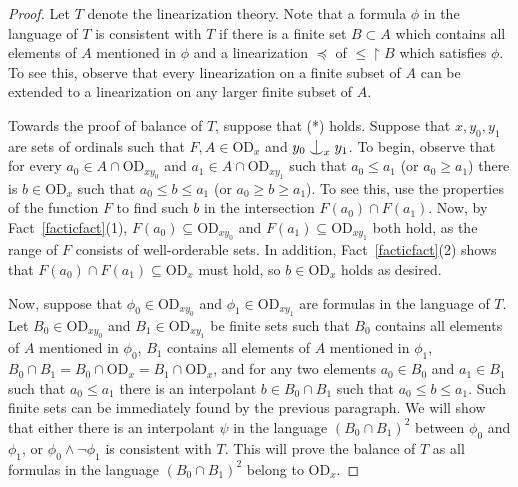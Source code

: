 \documentclass{article}
\newcommand{\forkindep}[1][]{%
  \mathrel{
    \mathop{
      \vcenter{
        \hbox{\oalign{\noalign{\kern-.3ex}\hfil$\vert$\hfil\cr
              \noalign{\kern-.7ex}
              $\smile$\cr\noalign{\kern-.3ex}}}
      }
    }\displaylimits_{#1}
  }
}
\newcommand{\vd}{\mathrm{OD}}
\theoremstyle{definition}
\begin{document}
\begin{proof}
Let $T$ denote the linearization theory. Note that a formula $\phi$ in the language of $T$ is consistent with $T$ if there is a finite set $B\subset A$ which contains all elements of $A$ mentioned in $\phi$ and a linearization $\preceq$ of $\leq\restriction B$ which satisfies $\phi$. To see this, observe that every linearization on a finite subset of $A$ can be extended to a linearization on any larger finite subset of $A$.

Towards the proof of balance of $T$, suppose that (*) holds. Suppose that $x, y_0, y_1$ are sets of ordinals such that $F, A\in\vd_x$ and $y_0\forkindep[x]y_1$. 
To begin, observe that for every $a_0\in A\cap\vd_{xy_0}$ and $a_1\in A\cap\vd_{xy_1}$ such that $a_0\leq a_1$ (or $a_0\geq a_1$) there is $b\in\vd_x$ such that $a_0\leq b\leq a_1$ (or $a_0\geq b\geq a_1$). To see this, use the properties of the function $F$ to find such $b$ in the intersection $F(a_0)\cap F(a_1)$. Now, by Fact~\ref{facticfact}(1), $F(a_0)\subseteq \vd_{xy_0}$ and $F(a_1)\subseteq\vd_{xy_1}$ both hold, as the range of $F$ consists of well-orderable sets. In addition, Fact~\ref{facticfact}(2) shows that $F(a_0)\cap F(a_1)\subseteq\vd_x$ must hold, so $b\in\vd_x$ holds as desired.

Now, suppose that $\phi_0\in\vd_{xy_0}$ and $\phi_1\in\vd_{xy_1}$ are formulas in the language of $T$. Let $B_0\in\vd_{xy_0}$ and $B_1\in\vd_{xy_1}$ be finite sets such that $B_0$ contains all elements of $A$ mentioned in $\phi_0$, $B_1$ contains all elements of $A$ mentioned in $\phi_1$, $B_0\cap B_1=B_0\cap\vd_x=B_1\cap\vd_x$, and for any two elements $a_0\in B_0$ and $a_1\in B_1$ such that $a_0\leq a_1$ there is an interpolant $b\in B_0\cap B_1$ such that $a_0\leq b\leq a_1$. Such finite sets can be immediately found by the previous paragraph. We will show that either there is an interpolant $\psi$ in the language $(B_0\cap B_1)^2$ between $\phi_0$ and $\phi_1$, or $\phi_0\land\lnot\phi_1$ is consistent with $T$. This will prove the balance of $T$ as all formulas in the language $(B_0\cap B_1)^2$ belong to $\vd_x$.


\end{proof}
\end{document}
